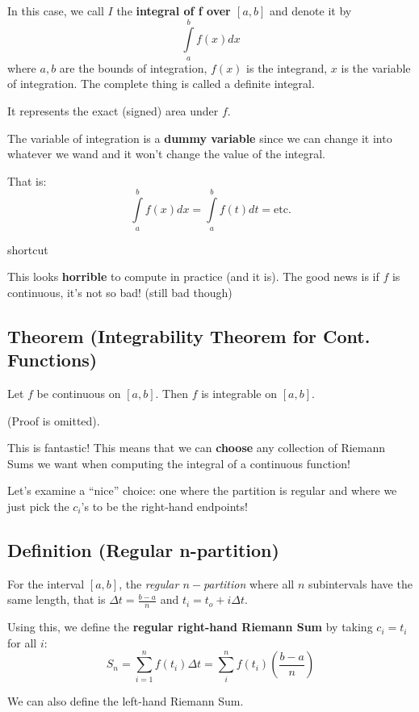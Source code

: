 In this case, we call $ I $ the \textbf{integral of f over $ [a,b] $ } and denote it by
\[ \int\limits_{a}^{b} f(x) dx \]
where $ a,b $ are the bounds of integration, $ f(x) $ is the integrand, $ x $ is the
variable of integration. The complete thing is called a definite integral.

It represents the exact (signed) area under $ f $.

\begin{remark}
    The variable of integration is a \textbf{dummy variable} since we can change it into
    whatever we wand and it won't change the value of the integral.

    That is:
    \[
        \int\limits_{a}^{b} f(x) dx =
        \int\limits_{a}^{b} f(t) d{t} = \text{etc.}
    \]
\end{remark}
shortcut

This looks \textbf{horrible} to compute in practice (and it is). The good news is if
$ f $ is continuous, it's not so bad! (still bad though)

\subsection{Theorem (Integrability Theorem for Cont. Functions)}
Let $ f $ be continuous on $ [a,b] $. Then $ f $ is integrable on $ [a,b] $.

(Proof is omitted).

This is fantastic! This means that we can \textbf{choose} any collection of Riemann Sums
we want when computing the integral of a continuous function!

Let's examine a ``nice'' choice: one where the partition is regular and where we just
pick the $ c_i $'s to be the right-hand endpoints!

\subsection{Definition (Regular n-partition)}
For the interval $ [a,b] $, the \emph{regular $n-$partition} where all $ n $ subintervals
have the same length, that is $ \Delta t=\frac{b-a}{n} $ and $ t_i=t_o+i\Delta t $.

Using this, we define the \textbf{regular right-hand Riemann Sum} by taking $ c_i=t_i $ for
all $ i $:
\[ S_n=\sum\limits_{i=1}^{n} f(t_i)\Delta t=\sum\limits_{i}^{n} f(t_i)\left(\frac{b-a}{n}\right) \]

\begin{remark}
    We can also define the left-hand Riemann Sum.
\end{remark}

